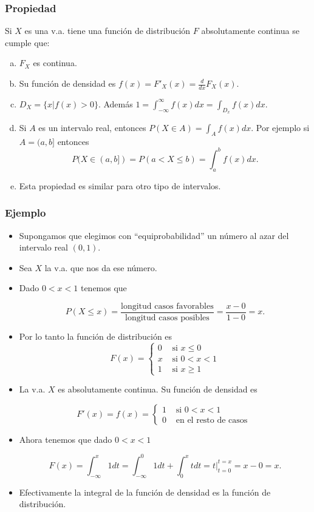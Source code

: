 \begin{frame}
\frametitle{Propiedad}
Si $X$  es una v.a. tiene una función de distribución $F$ absolutamente continua se cumple que:
\begin{enumerate}[a)]
\item $F_{X}$ es continua.
\item Su funci\'on de densidad es $f(x)=F'_{X}(x)=\frac{d}{dx}F_{X}(x)$.
\item $D_X=\{x| f(x)>0\}$. Además $1=\int_{-\infty}^{\infty} f(x) dx=\int_{D_x} f(x) dx$.
\item Si  $A$ es un intervalo real, entonces $\displaystyle P(X\in A)=\int_{A} f(x) dx$.\newline
Por ejemplo si $A=(a,b]$ entonces 
$$\displaystyle P(X\in(a,b])=P(a<X\leq b)=\int_{a}^b f(x) dx.$$
\item Esta propiedad es similar para otro tipo de intervalos. 
\end{enumerate}
\end{frame}


\begin{frame}
\frametitle{Ejemplo}
\begin{itemize}
\item Supongamos que elegimos con ``equiprobabilidad'' un número al azar del intervalo real $(0,1)$.
\item Sea $X$ la v.a. que nos da ese número. 
\item Dado $0<x<1$ tenemos que 

$$P(X\leq x)=\frac{\mbox{longitud casos favorables}}{\mbox{longitud casos posibles}}= \frac{x-0}{1-0}=x.$$
\item Por lo tanto la función de distribución es 
$$F(x)=\left\{\begin{array}{ll} 0 &\mbox{ si } x\leq 0 \\
x  & \mbox{ si } 0<x<1\\
1 & \mbox{ si } x\geq 1
 \end{array}\right.
$$
\end{itemize}
\end{frame}

\begin{frame}
\begin{itemize}
\item La v.a. $X$  es absolutamente continua. Su función de densidad es 

$$
F'(x)=f(x)=\left\{\begin{array}{ll} 1 &\mbox{ si } 0 <x<1 \\
0 & \mbox{ en el resto de casos } 
 \end{array}\right.
$$

\item Ahora tenemos que  dado $0<x<1$

$$F(x)=\int_{-\infty}^x 1 dt =\int_{-\infty}^0 1 dt + \int_{0}^x t dt = \left.t\right|_{t=0}^{t=x}=x-0=x.$$
\item Efectivamente la integral de la función de densidad es la función de distribución.
\end{itemize}
\end{frame}

